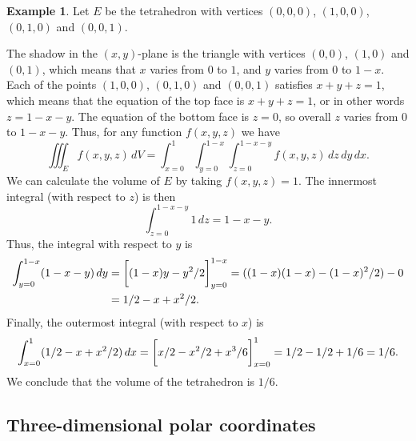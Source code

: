 \documentclass[reqno]{amsart}
\theoremstyle{definition}
\newtheorem{example}[theorem]{Example}
\begin{document}
\begin{example}
 Let $E$ be the tetrahedron with vertices $(0,0,0)$, $(1,0,0)$,
 $(0,1,0)$ and $(0,0,1)$.  
 \begin{center}
 \end{center}
 The shadow in the $(x,y)$-plane is the triangle with vertices
 $(0,0)$, $(1,0)$ and $(0,1)$, which means that $x$ varies from $0$ to
 $1$, and $y$ varies from $0$ to $1-x$.  Each of the points $(1,0,0)$,
 $(0,1,0)$ and $(0,0,1)$ satisfies $x+y+z=1$, which means that the
 equation of the top face is $x+y+z=1$, or in other words $z=1-x-y$.
 The equation of the bottom face is $z=0$, so overall $z$ varies from
 $0$ to $1-x-y$.  Thus, for any function $f(x,y,z)$ we have 
 \[ \iiint_E f(x,y,z)\,dV = 
     \int_{x=0}^1 \int_{y=0}^{1-x} \int_{z=0}^{1-x-y}
      f(x,y,z) \,dz\,dy\,dx.
 \]
 We can calculate the volume of $E$ by taking $f(x,y,z)=1$.  The
 innermost integral (with respect to $z$) is then 
 \[ \int_{z=0}^{1-x-y}1\,dz = 1-x-y. \]
 Thus, the integral with respect to $y$ is
 \begin{align*}
  \int_{y=0}^{1-x} (1-x-y)\,dy
   &= \CH{(1-x)y-y^2/2}_{y=0}^{1-x} 
    = ((1-x)(1-x)-(1-x)^2/2) - 0 \\
   &= 1/2-x+x^2/2.
 \end{align*}
 Finally, the outermost integral (with respect to $x$) is
 \[ \int_{x=0}^1 (1/2-x+x^2/2)\,dx = 
     \CH{x/2-x^2/2+x^3/6}_{x=0}^1 =
      1/2-1/2+1/6 = 1/6.
 \]
 We conclude that the volume of the tetrahedron is $1/6$.
\end{example}

\subsection{Three-dimensional polar coordinates}
\label{subsec-polar-three}
\end{document}
